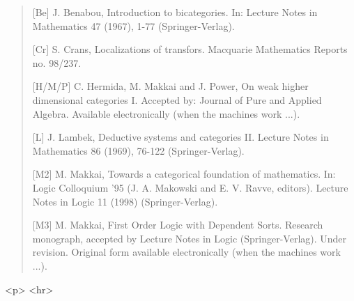 \begin{quote}
[Be]	J. Benabou, Introduction to bicategories. In: Lecture Notes in
Mathematics 47 (1967), 1-77 (Springer-Verlag). 

[Cr]	S. Crans, Localizations of transfors. Macquarie Mathematics
Reports no. 98/237. 

[H/M/P]	C. Hermida, M. Makkai and J. Power, On weak higher dimensional
categories I. Accepted by: Journal of Pure and Applied Algebra. Available
electronically (when the machines work ...).

[L]	J. Lambek, Deductive systems and categories II. Lecture Notes in
Mathematics 86 (1969), 76-122 (Springer-Verlag). 

[M2]	M. Makkai, Towards a categorical foundation of mathematics. In:
Logic Colloquium '95 (J. A. Makowski and E. V. Ravve, editors). Lecture
Notes in Logic 11 (1998) (Springer-Verlag). 

[M3]	M. Makkai, First Order Logic with Dependent Sorts. Research
monograph, accepted by Lecture Notes in Logic (Springer-Verlag). Under
revision. Original form available electronically (when the machines
work ...). 

\end{quote}
    

<p> <hr>



